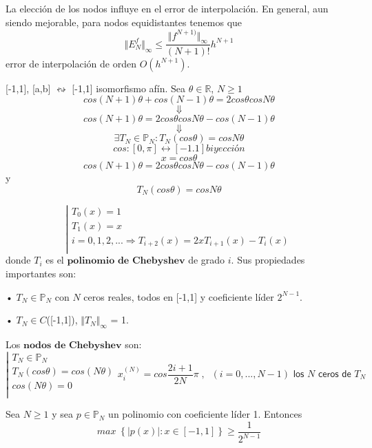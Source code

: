 La elección de los nodos influye en el error de interpolación. En general, aun siendo mejorable, para nodos equidistantes tenemos que
\[ \Vert E_N^f \Vert _\infty \leq \frac{\Vert f^{N+1)} \Vert _\infty}{(N+1)!}h^{N+1} \]
error de interpolación de orden $O \left( h^{N+1} \right)$.

[-1,1], [a,b] $\leftrightsquigarrow$ [-1,1] isomorfismo afín. Sea $\theta \in \mathbb{R}$, $N \geq 1$
\[ cos(N+1) \theta + cos(N-1) \theta = 2cos \theta cos N\theta \]
\[\Downarrow \]
\[ cos(N+1) \theta = 2cos \theta cos N\theta - cos(N-1) \theta \]
\[ \Downarrow \]
\[ \exists T_N \in \mathbb{P}_N : T_N (cos \theta ) = cos N\theta \]
\[ cos : \left[ 0,\pi \right] \longleftrightarrow \left[ -1.1 \right] biyección \]
\[ x = cos \theta \]
\[ cos (N+1) \theta = 2 cos \theta cos N\theta - cos(N-1) \theta \]
y
\[ T_N(cos \theta ) = cos N\theta \]

\[
\left| 
\begin{array}{c}
T_0(x)=1 \\
T_1(x)=x \\
i=0,1,2,... \Rightarrow T_{i+2}(x)=2xT_{i+1}(x)-T_i(x) \\
\end{array}
\right.
\]
donde $T_i$ es el $\textbf{polinomio de Chebyshev}$ de grado $i$. Sus propiedades importantes son:

\begin{nlist}
\item[•] $T_N \in \mathbb{P}_N$ con $N$ ceros reales, todos en [-1,1] y coeficiente líder $2^{N-1}$.
\item[•] $T_N \in C$([-1,1]), $\Vert T_N \Vert _\infty$ = 1.
\end{nlist}

Los $\textbf{nodos de Chebyshev}$ son:
\[
\left| 
\begin{array}{c}
T_N \in \mathbb{P}_N \\
T_N(cos \theta ) = cos(N \theta ) \\
cos(N\theta ) = 0 \\
\end{array}
\right.
x_i^{(N)} = cos \frac{2i+1}{2N}\pi \; , \; \; (i=0,...,N-1) \textsf{ los } N \textsf{ ceros de } T_N
\]

\begin{nth}[Chebyshev]
Sea $N \geq 1$ y sea $p \in \mathbb{P} _N$ un polinomio con coeficiente líder 1. Entonces
\[ max \; \left\lbrace \vert p(x) \vert : x \in \left[ -1,1 \right] \right\rbrace \geq \frac{1}{2^{N-1}} \]
\end{nth}

